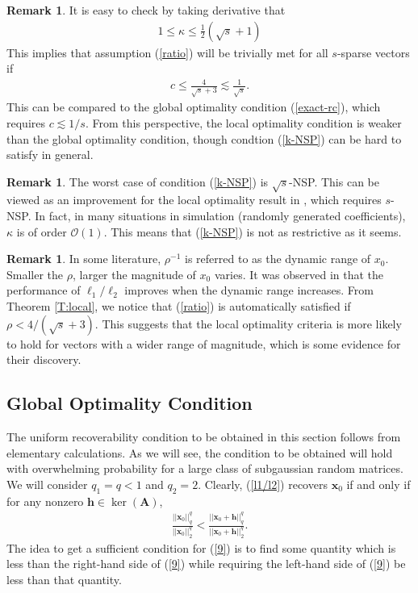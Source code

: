 \documentclass[11pt]{article}
\numberwithin{equation}{section}
\theoremstyle{plain}
\theoremstyle{definition}
\newtheorem{Rem}[Th]{Remark}
\def\A{{\mathbf A}}
\def\x{{\mathbf x}}
\def\h{{\mathbf{h}}}
\begin{document}
\begin{Rem}
It is easy to check by taking derivative that
\begin{align*}
1\leq\kappa\leq\frac{1}{2}(\sqrt{s}+1)
\end{align*}
This implies that assumption (\ref{ratio}) will be trivially met for all $s$-sparse vectors if 
\begin{align*}
c\leq\frac{4}{\sqrt{s}+3}\lesssim\frac{1}{\sqrt{s}}. 
\end{align*}
This can be compared to the global optimality condition (\ref{exact-rc}),  which requires $c\lesssim 1/s$. From this perspective, the local optimality condition is weaker than the global optimality condition, though condtion (\ref{k-NSP}) can be hard to satisfy in general. 
\end{Rem}

\begin{Rem}
The worst case of condition (\ref{k-NSP}) is $\sqrt{s}$-NSP. This can be viewed as an improvement for the local optimality result in \cite{rahimi2018scale}, which requires $s$-NSP. In fact, in many situations in simulation (randomly generated coefficients), $\kappa$ is of order $\mathcal{O}(1)$. This means that (\ref{k-NSP}) is not as restrictive as it seems.  
\end{Rem}

\begin{Rem}
In some literature, $\rho^{-1}$ is referred to as the dynamic range of $x_0$. Smaller the $\rho$, larger the magnitude of $x_0$ varies. It was observed in \cite{rahimi2018scale} that the performance of $\ell_1/\ell_2$ improves when the dynamic range increases. From Theorem \ref{T:local}, we notice that  (\ref{ratio}) is automatically satisfied if $\rho<4/(\sqrt{s}+3)$. This suggests that the local optimality criteria is more likely to hold for vectors with a wider range of magnitude, which is some evidence for their discovery. 
\end{Rem} 


\subsection{Global Optimality Condition}

The uniform recoverability condition to be obtained in this section follows from elementary calculations. As we will see, the condition to be obtained will hold with overwhelming probability for a large class of subgaussian random matrices. We will consider $q_1=q<1$ and $q_2=2$. Clearly, (\ref{l1/l2}) recovers $\x_0$ if and only if for any nonzero $\h\in \ker(\A)$,
\begin{align}
\frac{||\x_0||^q_q}{||\x_0||^q_2}<\frac{||\x_0+\h||^q_q}{||\x_0+\h||^q_2}.\label{9}
\end{align}
The idea to get a sufficient condition for (\ref{9}) is to find some quantity which is less than the right-hand side of (\ref{9}) while requiring the left-hand side of (\ref{9}) be less than that quantity.     
\end{document}

